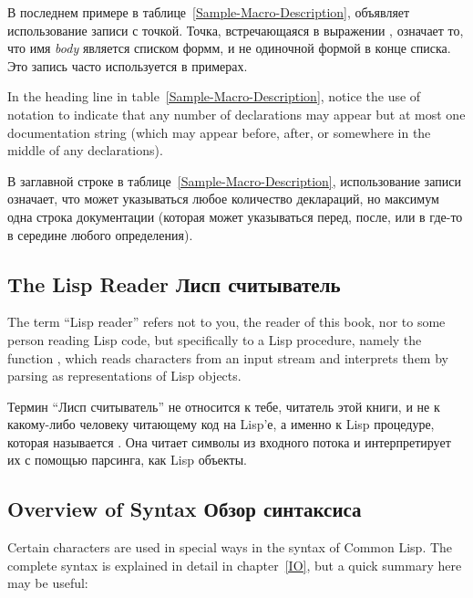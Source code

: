 В последнем примере в таблице~\ref{Sample-Macro-Description}, объявляет
использование записи с точкой. Точка, встречающаяся в
выражении , означает то, что имя {\it
body} является списком формм, и не одиночной формой в конце списка. Это запись
часто используется в примерах.

\begin{newer}
In the heading line in table~\ref{Sample-Macro-Description}, notice the
use of \Mchoice{~} notation to indicate that any number of declarations
may appear but at most one documentation string (which may appear before,
after, or somewhere in the middle of any declarations).

В заглавной строке в таблице~\ref{Sample-Macro-Description}, использование
записи \Mchoise{~} означает, что может указываться любое количество деклараций,
но максимум одна строка документации (которая может указываться перед, после,
или в где-то в середине любого определения).
\end{newer}

\subsection{The Lisp Reader Лисп считыватель}

The term ``Lisp reader'' refers not to you, the reader of this book,
nor to some person reading Lisp code, but specifically
to a Lisp procedure, namely the function ,
which reads characters from an input stream and interprets them by parsing
as representations of Lisp objects.

Термин ``Лисп считыватель'' не относится к тебе, читатель этой книги, и не к
какому-либо человеку читающему код на Lisp'е, а именно к Lisp процедуре, которая
называется . Она читает символы из входного потока и интерпретирует их
с помощью парсинга, как Lisp объекты.

\subsection{Overview of Syntax Обзор синтаксиса}

Certain characters are used in special ways in the syntax of Common Lisp.
The complete syntax is explained in detail in chapter~\ref{IO},
but a quick summary here may be useful:

